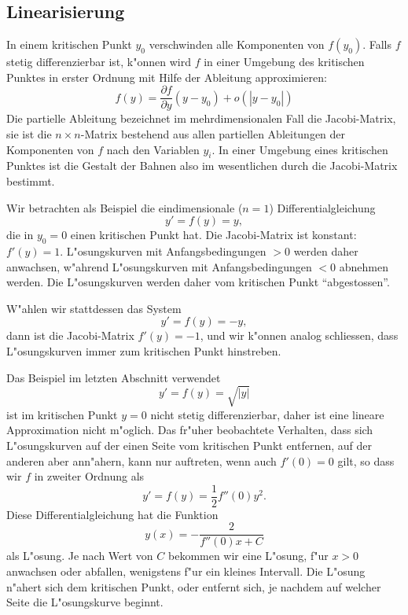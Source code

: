 %
%
\subsection{Linearisierung}
In einem kritischen Punkt $y_0$ verschwinden alle Komponenten von $f(y_0)$.
Falls $f$ stetig differenzierbar ist, k"onnen wird $f$ in einer Umgebung
des kritischen Punktes in erster Ordnung mit Hilfe der Ableitung
approximieren:
\[
f(y)=\frac{\partial f}{\partial y}(y-y_0) + o(|y-y_0|)
\]
Die partielle Ableitung bezeichnet im mehrdimensionalen Fall
die Jacobi-Matrix, sie ist die $n\times n$-Matrix bestehend aus allen
partiellen Ableitungen der Komponenten von $f$ nach den Variablen $y_i$.
In einer Umgebung eines kritischen Punktes ist die Gestalt der Bahnen also
im wesentlichen durch die Jacobi-Matrix bestimmt.

\begin{beispiel}
Wir betrachten als Beispiel die eindimensionale ($n=1$) Differentialgleichung
\[
y'=f(y)=y,
\]
die in $y_0=0$ einen kritischen Punkt hat.
Die Jacobi-Matrix ist konstant: $f'(y)=1$.
L"osungskurven mit Anfangsbedingungen $>0$ werden daher anwachsen,
w"ahrend L"osungskurven mit Anfangsbedingungen $<0$ abnehmen werden.
Die L"osungskurven werden daher vom kritischen Punkt ``abgestossen''.

W"ahlen wir stattdessen das System
\[
y'=f(y)=-y,
\]
dann ist die Jacobi-Matrix $f'(y)=-1$, und wir k"onnen analog schliessen,
dass L"osungskurven immer zum kritischen Punkt hinstreben.
\end{beispiel}

\begin{beispiel}
Das Beispiel im letzten Abschnitt verwendet
\[
y'=f(y)=\sqrt{|y|}
\]
ist im kritischen Punkt $y=0$ nicht stetig differenzierbar, daher ist
eine lineare Approximation nicht m"oglich.
Das fr"uher beobachtete Verhalten, dass sich L"osungskurven auf der
einen Seite vom kritischen Punkt entfernen, auf der anderen aber ann"ahern,
kann nur auftreten, wenn auch $f'(0)=0$ gilt, so dass wir $f$ in zweiter
Ordnung als
\[
y'=f(y)=\frac12 f''(0)y^2.
\]
Diese Differentialgleichung hat die Funktion
\[
y(x)=-\frac{2}{f''(0)x+C}
\]
als L"osung.
Je nach Wert von $C$ bekommen wir eine L"osung, f"ur $x>0$ anwachsen
oder abfallen, wenigstens f"ur ein kleines Intervall.
Die L"osung n"ahert sich dem kritischen Punkt, oder entfernt sich, je
nachdem auf welcher Seite die L"osungskurve beginnt.
\end{beispiel}

%
%
